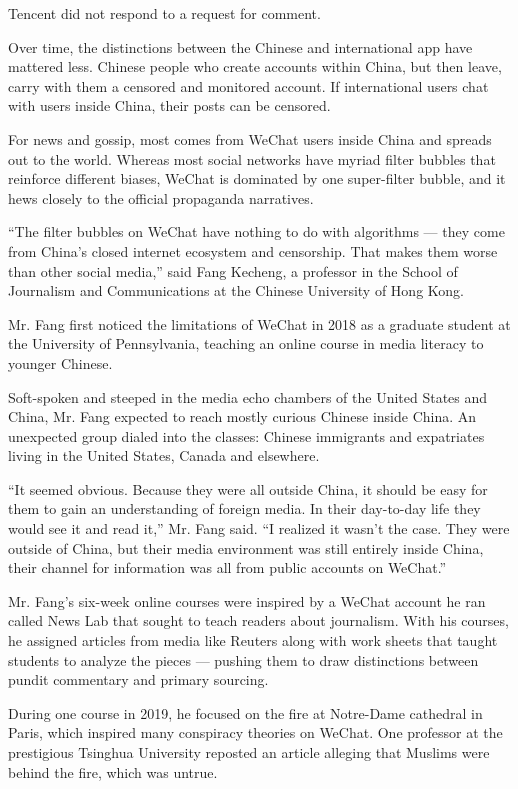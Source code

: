 Tencent did not respond to a request for comment.

Over time, the distinctions between the Chinese and international app
have mattered less. Chinese people who create accounts within China, but
then leave, carry with them a censored and monitored account. If
international users chat with users inside China, their posts can be
censored.

For news and gossip, most comes from WeChat users inside China and
spreads out to the world. Whereas most social networks have myriad
filter bubbles that reinforce different biases, WeChat is dominated by
one super-filter bubble, and it hews closely to the official propaganda
narratives.

``The filter bubbles on WeChat have nothing to do with algorithms ---
they come from China's closed internet ecosystem and censorship. That
makes them worse than other social media,'' said Fang Kecheng, a
professor in the School of Journalism and Communications at the Chinese
University of Hong Kong.

Mr. Fang first noticed the limitations of WeChat in 2018 as a graduate
student at the University of Pennsylvania, teaching an online course in
media literacy to younger Chinese.

Soft-spoken and steeped in the media echo chambers of the United States
and China, Mr. Fang expected to reach mostly curious Chinese inside
China. An unexpected group dialed into the classes: Chinese immigrants
and expatriates living in the United States, Canada and elsewhere.

``It seemed obvious. Because they were all outside China, it should be
easy for them to gain an understanding of foreign media. In their
day-to-day life they would see it and read it,'' Mr. Fang said. ``I
realized it wasn't the case. They were outside of China, but their media
environment was still entirely inside China, their channel for
information was all from public accounts on WeChat.''

Mr. Fang's six-week online courses were inspired by a WeChat account he
ran called News Lab that sought to teach readers about journalism. With
his courses, he assigned articles from media like Reuters along with
work sheets that taught students to analyze the pieces --- pushing them
to draw distinctions between pundit commentary and primary sourcing.

During one course in 2019, he focused on the fire at Notre-Dame
cathedral in Paris, which inspired many conspiracy theories on WeChat.
One professor at the prestigious Tsinghua University reposted an article
alleging that Muslims were behind the fire, which was untrue.

